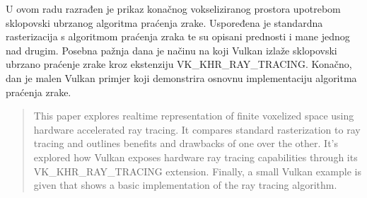 \documentclass[times, utf8, zavrsni]{fer}
\begin{document}
U ovom radu razrađen je prikaz konačnog vokseliziranog prostora upotrebom sklopovski ubrzanog algoritma praćenja zrake. Uspoređena je standardna rasterizacija s algoritmom praćenja zraka te su opisani prednosti i mane jednog nad drugim. Posebna pažnja dana je načinu na koji Vulkan izlaže sklopovski ubrzano praćenje zrake kroz ekstenziju VK\_KHR\_RAY\_TRACING. Konačno, dan je malen Vulkan primjer koji demonstrira osnovnu implementaciju algoritma praćenja zrake.


\begin{abstract}
This paper explores realtime representation of finite voxelized space using hardware accelerated ray tracing. It compares standard rasterization to ray tracing and outlines benefits and drawbacks of one over the other. It's explored how Vulkan exposes hardware ray tracing capabilities through its  VK\_KHR\_RAY\_TRACING extension. Finally, a small Vulkan example is given that shows a basic implementation of the ray tracing algorithm.

\end{abstract}
\end{document}
